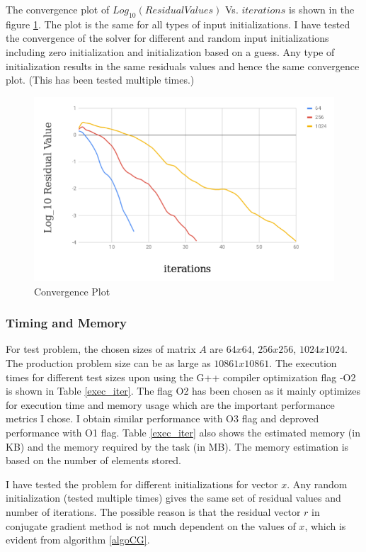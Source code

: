 \documentclass{article}
\begin{document}
\begin{spacing}{1.1}
The convergence plot of $Log_{10}(Residual Values)$ Vs. $iterations$ is shown in the figure \ref{convPlot}. The plot is the same for all types of input initializations. I have tested the convergence of the solver for different and random input initializations including zero initialization and initialization based on a guess. Any type of initialization results in the same residuals values and hence the same convergence plot. (This has been tested multiple times.)
\begin{center}
	\begin{figure}[H]
	\centering
       \includegraphics[scale=.40]{convergence.png}
        \caption{\label{convPlot} Convergence Plot} 
	\end{figure}
\end{center}


\subsubsection*{Timing and Memory}
For test problem, the chosen sizes of matrix $A$ are $64x64$, $256x256$, $1024x1024$. The production problem size can be as large as $10861x10861$. 
The execution times for different test sizes upon using the G++ compiler optimization flag -O2 is shown in Table \ref{exec_iter}. The flag O2 has been chosen as it mainly optimizes for execution time and memory usage which are the important performance metrics I chose. I obtain similar performance with O3 flag and deproved performance with O1 flag. Table \ref{exec_iter} also shows the estimated memory (in KB) and the memory required by the task (in MB). The memory estimation is based on the number of elements stored. 

I have tested the problem for different initializations for vector $x$. Any random initialization (tested multiple times) gives the same set of residual values and number of iterations. The possible reason is that the residual vector $r$ in conjugate gradient method is not much dependent on the values of $x$, which is evident from algorithm \eqref{algoCG}.


\end{spacing}
\end{document}
